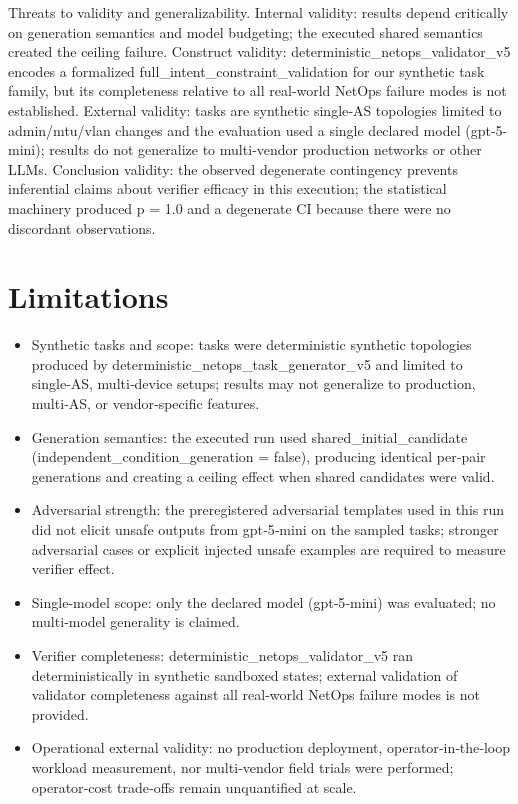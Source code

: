 \documentclass[conference]{IEEEtran}
\begin{document}
Threats to validity and generalizability. Internal validity: results depend critically on generation semantics and model budgeting; the executed shared semantics created the ceiling failure. Construct validity: deterministic\_netops\_validator\_v5 encodes a formalized full\_intent\_constraint\_validation for our synthetic task family, but its completeness relative to all real‑world NetOps failure modes is not established. External validity: tasks are synthetic single‑AS topologies limited to admin/mtu/vlan changes and the evaluation used a single declared model (gpt-5-mini); results do not generalize to multi‑vendor production networks or other LLMs. Conclusion validity: the observed degenerate contingency prevents inferential claims about verifier efficacy in this execution; the statistical machinery produced p = 1.0 and a degenerate CI because there were no discordant observations.

\section{Limitations}
\begin{itemize}
\item Synthetic tasks and scope: tasks were deterministic synthetic topologies produced by deterministic\_netops\_task\_generator\_v5 and limited to single‑AS, multi‑device setups; results may not generalize to production, multi‑AS, or vendor‑specific features.
\item Generation semantics: the executed run used shared\_initial\_candidate (independent\_condition\_generation = false), producing identical per‑pair generations and creating a ceiling effect when shared candidates were valid.
\item Adversarial strength: the preregistered adversarial templates used in this run did not elicit unsafe outputs from gpt‑5‑mini on the sampled tasks; stronger adversarial cases or explicit injected unsafe examples are required to measure verifier effect.
\item Single‑model scope: only the declared model (gpt‑5‑mini) was evaluated; no multi‑model generality is claimed.
\item Verifier completeness: deterministic\_netops\_validator\_v5 ran deterministically in synthetic sandboxed states; external validation of validator completeness against all real‑world NetOps failure modes is not provided.
\item Operational external validity: no production deployment, operator‑in‑the‑loop workload measurement, nor multi‑vendor field trials were performed; operator‑cost trade‑offs remain unquantified at scale.
\end{itemize}
\end{document}
